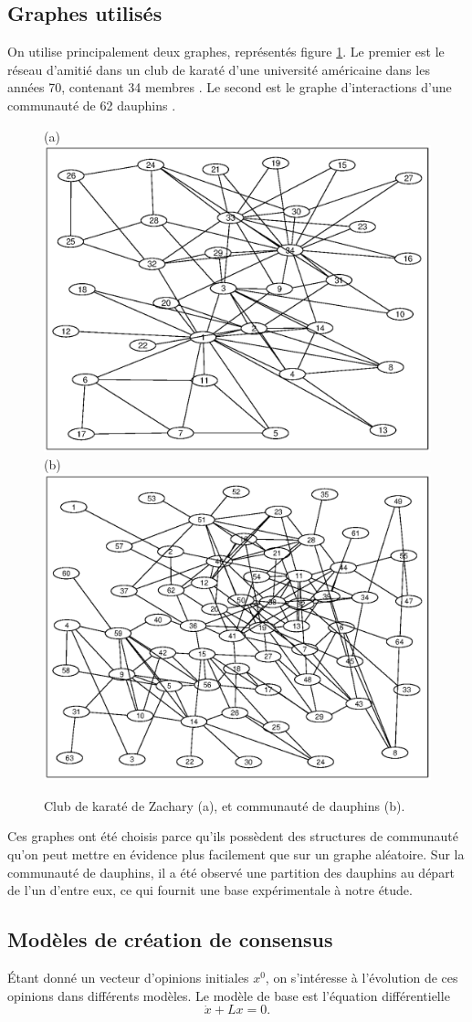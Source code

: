 \documentclass[12pt]{article}
\begin{document}
\subsection{Graphes utilisés}
On utilise principalement deux graphes, représentés figure
\ref{graphes}.  Le premier est le réseau d'amitié dans un club de
karaté d'une université américaine dans les années 70, contenant 34
membres \cite{zachary}. Le second est le graphe d'interactions d'une
communauté de 62 dauphins \cite{dolphins}.

\begin{figure}[htb]
  \centering
  (a)
  \includegraphics[width=.4 \textwidth]{zachary}
  (b)
  \includegraphics[width=.4 \textwidth]{dolphins}
  \caption{Club de karaté de Zachary (a), et communauté de dauphins (b).}
  \label{graphes}
\end{figure}

Ces graphes ont été choisis parce qu'ils possèdent des
structures de communauté qu'on peut mettre en évidence plus
facilement que sur un graphe aléatoire. Sur la communauté de
dauphins, il a été observé une partition des dauphins au départ
de l'un d'entre eux, ce qui fournit une base expérimentale à
notre étude.

\subsection{Modèles de création de consensus}
Étant donné un vecteur d'opinions initiales $x^0$, on
s'intéresse à l'évolution de ces opinions dans différents
modèles. Le modèle de base est l'équation différentielle
\begin{equation}
  \label{eq_diff}
  \dot x + L x = 0.
\end{equation}
\end{document}
